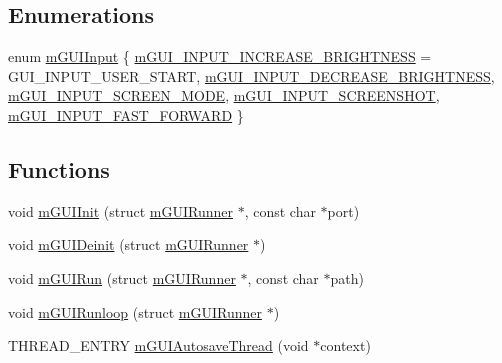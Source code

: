 \subsection*{Enumerations}
\begin{DoxyCompactItemize}
\item 
enum \mbox{\hyperlink{gui-runner_8h_ac190200f37f0499dccb86ebb1d15ced0}{m\+G\+U\+I\+Input}} \{ \newline
\mbox{\hyperlink{gui-runner_8h_ac190200f37f0499dccb86ebb1d15ced0a3af7363535b2615b88ab3ec4a197ee5d}{m\+G\+U\+I\+\_\+\+I\+N\+P\+U\+T\+\_\+\+I\+N\+C\+R\+E\+A\+S\+E\+\_\+\+B\+R\+I\+G\+H\+T\+N\+E\+SS}} = G\+U\+I\+\_\+\+I\+N\+P\+U\+T\+\_\+\+U\+S\+E\+R\+\_\+\+S\+T\+A\+RT, 
\mbox{\hyperlink{gui-runner_8h_ac190200f37f0499dccb86ebb1d15ced0ae54a7af768df3f7c793c07652b8d001d}{m\+G\+U\+I\+\_\+\+I\+N\+P\+U\+T\+\_\+\+D\+E\+C\+R\+E\+A\+S\+E\+\_\+\+B\+R\+I\+G\+H\+T\+N\+E\+SS}}, 
\mbox{\hyperlink{gui-runner_8h_ac190200f37f0499dccb86ebb1d15ced0ac63fa69551e8690d0651bc7dcc42c19f}{m\+G\+U\+I\+\_\+\+I\+N\+P\+U\+T\+\_\+\+S\+C\+R\+E\+E\+N\+\_\+\+M\+O\+DE}}, 
\mbox{\hyperlink{gui-runner_8h_ac190200f37f0499dccb86ebb1d15ced0aa808e86fce3835db3cabc04420409eaf}{m\+G\+U\+I\+\_\+\+I\+N\+P\+U\+T\+\_\+\+S\+C\+R\+E\+E\+N\+S\+H\+OT}}, 
\newline
\mbox{\hyperlink{gui-runner_8h_ac190200f37f0499dccb86ebb1d15ced0a309dd664e34ad9e20a0884748ba49b50}{m\+G\+U\+I\+\_\+\+I\+N\+P\+U\+T\+\_\+\+F\+A\+S\+T\+\_\+\+F\+O\+R\+W\+A\+RD}}
 \}
\end{DoxyCompactItemize}
\subsection*{Functions}
\begin{DoxyCompactItemize}
\item 
void \mbox{\hyperlink{gui-runner_8h_ad34949b1a8eea99a01dd34345c87f8a4}{m\+G\+U\+I\+Init}} (struct \mbox{\hyperlink{structm_g_u_i_runner}{m\+G\+U\+I\+Runner}} $\ast$, const char $\ast$port)
\item 
void \mbox{\hyperlink{gui-runner_8h_a5d0bba06810ebab1134e6d5d26d46767}{m\+G\+U\+I\+Deinit}} (struct \mbox{\hyperlink{structm_g_u_i_runner}{m\+G\+U\+I\+Runner}} $\ast$)
\item 
void \mbox{\hyperlink{gui-runner_8h_a857680d78d61544055058419bdca0bed}{m\+G\+U\+I\+Run}} (struct \mbox{\hyperlink{structm_g_u_i_runner}{m\+G\+U\+I\+Runner}} $\ast$, const char $\ast$path)
\item 
void \mbox{\hyperlink{gui-runner_8h_a613515116fcdd9bb3f2743607aa0c18e}{m\+G\+U\+I\+Runloop}} (struct \mbox{\hyperlink{structm_g_u_i_runner}{m\+G\+U\+I\+Runner}} $\ast$)
\item 
T\+H\+R\+E\+A\+D\+\_\+\+E\+N\+T\+RY \mbox{\hyperlink{gui-runner_8h_a893aeb86364bda67a415a000c4a690d6}{m\+G\+U\+I\+Autosave\+Thread}} (void $\ast$context)
\end{DoxyCompactItemize}


